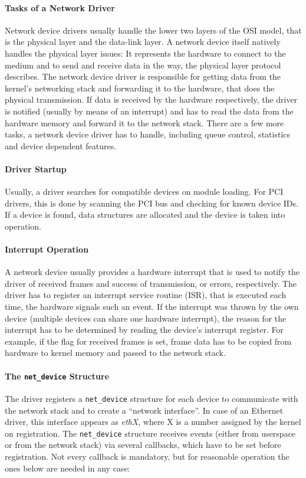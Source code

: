 \documentclass[a4paper,12pt,BCOR6mm,bibtotoc,idxtotoc]{scrbook}
\begin{document}
\paragraph{Tasks of a Network Driver} Network device drivers usually handle
the lower two layers of the OSI model, that is the physical layer and the
data-link layer. A network device itself natively handles the physical layer
issues: It represents the hardware to connect to the medium and to send and
receive data in the way, the physical layer protocol describes. The network
device driver is responsible for getting data from the kernel's networking
stack and forwarding it to the hardware, that does the physical transmission.
If data is received by the hardware respectively, the driver is notified
(usually by means of an interrupt) and has to read the data from the hardware
memory and forward it to the network stack. There are a few more tasks, a
network device driver has to handle, including queue control, statistics and
device dependent features.

\paragraph{Driver Startup} Usually, a driver searches for compatible devices
on module loading.  For PCI drivers, this is done by scanning the PCI bus and
checking for known device IDs. If a device is found, data structures are
allocated and the device is taken into operation.

\paragraph{Interrupt Operation} A network device usually
provides a hardware interrupt that is used to notify the driver of received
frames and success of transmission, or errors, respectively. The driver has to
register an interrupt service routine
(ISR), that is
executed each time, the hardware signals such an event. If the interrupt was
thrown by the own device (multiple devices can share one hardware interrupt),
the reason for the interrupt has to be determined by reading the device's
interrupt register. For example, if the flag for received frames is set, frame
data has to be copied from hardware to kernel memory and passed to the network
stack.

\paragraph{The \lstinline+net_device+ Structure} The driver
registers a \lstinline+net_device+ structure for each device to communicate
with the network stack and to create a ``network interface''. In case of an
Ethernet driver, this interface appears as \textit{ethX}, where X is a number
assigned by the kernel on registration. The \lstinline+net_device+ structure
receives events (either from userspace or from the network stack) via several
callbacks, which have to be set before registration. Not every callback is
mandatory, but for reasonable operation the ones below are needed in any case:
\end{document}
